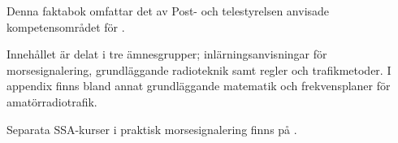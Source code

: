 \begin{rev-omarbetas}
Denna faktabok omfattar det av Post- och telestyrelsen anvisade
kompetensområdet för .

Innehållet är delat i tre ämnesgrupper; inlärningsanvisningar för
morsesignalering, grundläggande radioteknik samt regler och
trafikmetoder. I appendix finns bland annat grundläggande matematik
och frekvensplaner för amatörradiotrafik.

Separata SSA-kurser i praktisk morsesignalering finns på .
\end{rev-omarbetas}

